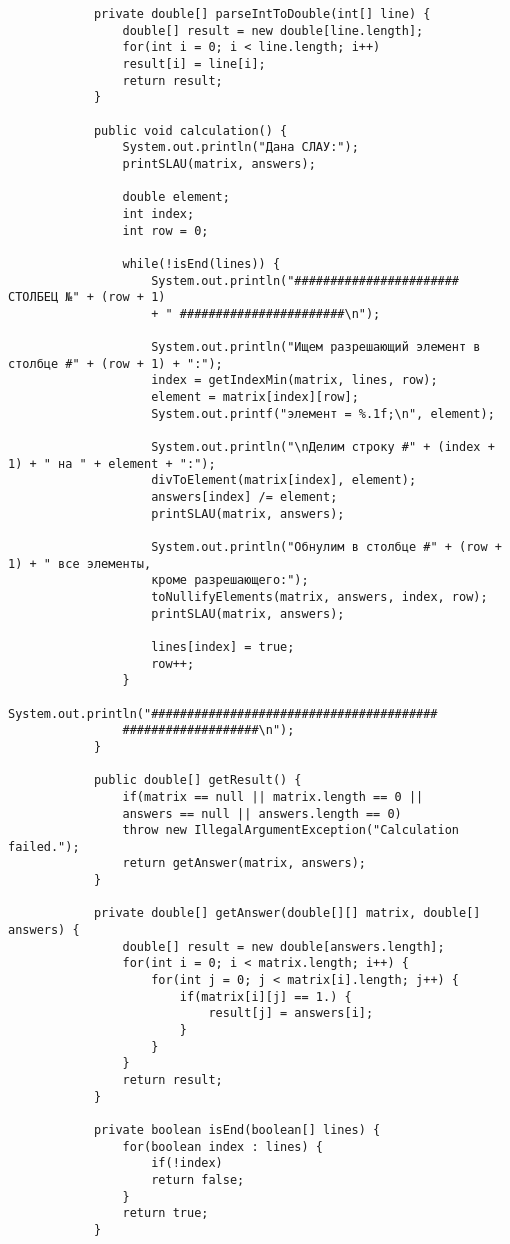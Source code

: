 \documentclass[12pt,a4paper]{scrartcl}
\begin{document}
\begin{verbatim}
	    	private double[] parseIntToDouble(int[] line) {
	    		double[] result = new double[line.length];
	    		for(int i = 0; i < line.length; i++)
	    		result[i] = line[i];
	    		return result;
	    	}
	    	
	    	public void calculation() {
	    		System.out.println("Дана СЛАУ:");
	    		printSLAU(matrix, answers);
	    		
	    		double element;
	    		int index;
	    		int row = 0;
	    		
	    		while(!isEnd(lines)) {
	    			System.out.println("####################### СТОЛБЕЦ №" + (row + 1)
	    			+ " #######################\n");
	    			
	    			System.out.println("Ищем разрешающий элемент в столбце #" + (row + 1) + ":");
	    			index = getIndexMin(matrix, lines, row);
	    			element = matrix[index][row];
	    			System.out.printf("элемент = %.1f;\n", element);
	    			
	    			System.out.println("\nДелим строку #" + (index + 1) + " на " + element + ":");
	    			divToElement(matrix[index], element);
	    			answers[index] /= element;
	    			printSLAU(matrix, answers);
	    			
	    			System.out.println("Обнулим в столбце #" + (row + 1) + " все элементы,
	    			кроме разрешающего:");
	    			toNullifyElements(matrix, answers, index, row);
	    			printSLAU(matrix, answers);
	    			
	    			lines[index] = true;
	    			row++;
	    		}
	    		System.out.println("########################################
	    		###################\n");
	    	}
	    	
	    	public double[] getResult() {
	    		if(matrix == null || matrix.length == 0 ||
	    	    answers == null || answers.length == 0)
	    		throw new IllegalArgumentException("Calculation failed.");
	    		return getAnswer(matrix, answers);
	    	}
	    	
	    	private double[] getAnswer(double[][] matrix, double[] answers) {
	    		double[] result = new double[answers.length];
	    		for(int i = 0; i < matrix.length; i++) {
	    			for(int j = 0; j < matrix[i].length; j++) {
	    				if(matrix[i][j] == 1.) {
	    					result[j] = answers[i];
	    				}
	    			}
	    		}
	    		return result;
	    	}
	    	
	    	private boolean isEnd(boolean[] lines) {
	    		for(boolean index : lines) {
	    			if(!index)
	    			return false;
	    		}
	    		return true;
	    	}
	    	

\end{verbatim}
\end{document}
